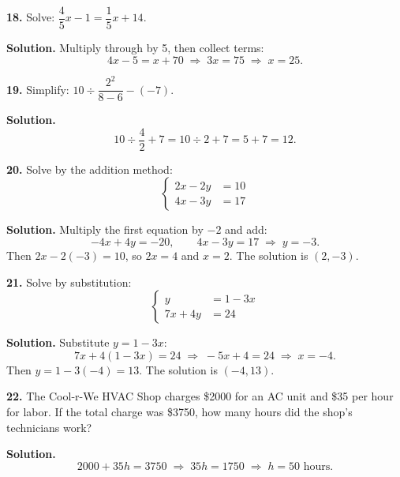 \documentclass{ximera}
\begin{document}
\begin{problem}

\textbf{18.} Solve: $\dfrac{4}{5}x-1=\dfrac{1}{5}x+14$.

\begin{hint}
\textbf{Solution.} Multiply through by 5, then collect terms:
\[
  4x-5=x+70 \;\Longrightarrow\; 3x=75 \;\Longrightarrow\; x=25 .
\]
\end{hint}
\end{problem}

\begin{problem}

\textbf{19.} Simplify: $10 \div \dfrac{2^{2}}{8-6}-(-7)$.

\begin{hint}
\textbf{Solution.}
\[
  10 \div \frac{4}{2}+7 = 10 \div 2+7 = 5+7 = 12 .
\]
\end{hint}
\end{problem}

\begin{problem}

\textbf{20.} Solve by the addition method:
\[
  \left\{\begin{aligned}
    2x-2y &= 10 \\
    4x-3y &= 17
  \end{aligned}\right.
\]

\begin{hint}
\textbf{Solution.} Multiply the first equation by $-2$ and add:
\[
  -4x+4y=-20, \qquad 4x-3y=17 \;\Longrightarrow\; y=-3 .
\]
Then $2x-2(-3)=10$, so $2x=4$ and $x=2$. The solution is $(2,-3)$.
\end{hint}
\end{problem}

\begin{problem}

\textbf{21.} Solve by substitution:
\[
  \left\{\begin{aligned}
    y &= 1-3x \\
    7x+4y &= 24
  \end{aligned}\right.
\]

\begin{hint}
\textbf{Solution.} Substitute $y=1-3x$:
\[
  7x+4(1-3x)=24 \;\Longrightarrow\; -5x+4=24 \;\Longrightarrow\; x=-4 .
\]
Then $y=1-3(-4)=13$. The solution is $(-4,13)$.
\end{hint}
\end{problem}

\begin{problem}

\textbf{22.} The Cool-r-We HVAC Shop charges \$2000 for an AC unit and \$35 per hour for
labor. If the total charge was \$3750, how many hours did the shop's technicians work?

\begin{hint}
\textbf{Solution.}
\[
  2000+35h=3750 \;\Longrightarrow\; 35h=1750 \;\Longrightarrow\; h=50 \text{ hours}.
\]
\end{hint}
\end{problem}
\end{document}

